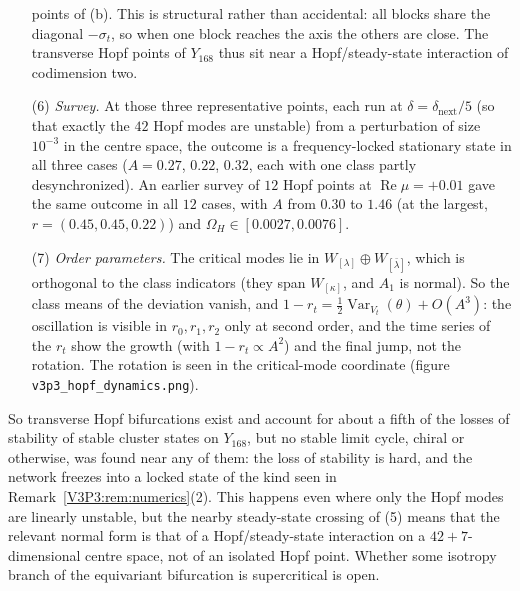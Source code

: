 \begin{remark}
\begin{enumerate}
points of (b). This is structural rather than accidental: all blocks share the diagonal $-\sigma_t$, so
when one block reaches the axis the others are close. The transverse Hopf points of $Y_{168}$ thus
sit near a Hopf/steady-state interaction of codimension two.
\item[(6)] \emph{Survey.} At those three representative points, each run at
$\delta=\delta_{\mathrm{next}}/5$ (so that exactly the $42$ Hopf modes are unstable) from a perturbation
of size $10^{-3}$ in the centre space, the outcome is a frequency-locked stationary state in all three
cases ($A=0.27$, $0.22$, $0.32$, each with one class partly desynchronized). An earlier survey of
$12$ Hopf points at $\operatorname{Re}\mu=+0.01$ gave the same outcome in all $12$ cases, with $A$ from
$0.30$ to $1.46$ (at the largest, $r=(0.45,0.45,0.22)$) and $\Omega_H\in[0.0027,0.0076]$.
\item[(7)] \emph{Order parameters.} The critical modes lie in $W_{[\lambda]}\oplus W_{[\bar\lambda]}$,
which is orthogonal to the class indicators (they span $W_{[\kappa]}$, and $A_1$ is normal). So the
class means of the deviation vanish, and $1-r_t=\frac12\operatorname{Var}_{V_t}(\theta)+O(A^{3})$:
the oscillation is visible in $r_0,r_1,r_2$ only at second order, and the time series of the
$r_t$ show the growth (with $1-r_t\propto A^{2}$) and the final jump, not the rotation. The rotation
is seen in the critical-mode coordinate (figure \texttt{v3p3\_hopf\_dynamics.png}).
\end{enumerate}
So transverse Hopf bifurcations exist and account for about a fifth of the losses of stability of
stable cluster states on $Y_{168}$, but no stable limit cycle, chiral or otherwise, was found near
any of them: the loss of stability is hard, and the network freezes into a locked state of the kind
seen in Remark~\ref{V3P3:rem:numerics}(2). This happens even where only the Hopf modes are linearly
unstable, but the nearby steady-state crossing of (5) means that the relevant normal form is that of a
Hopf/steady-state interaction on a $42+7$-dimensional centre space, not of an isolated Hopf point.
Whether some isotropy branch of the equivariant bifurcation is supercritical is open.
\end{remark}

